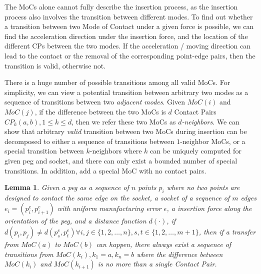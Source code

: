 \documentclass[letterpaper, 10 pt, conference]{ieeeconf}
\newtheorem{lemma}[theorem]{Lemma}
\begin{document}
The MoCs alone cannot fully describe the insertion process, as the insertion process also involves the transition between different modes. To find out whether a transition between two Mode of Contact under a given force is possible, we can find the acceleration direction under the insertion force, and the location of the different CPs between the two modes. If the acceleration / moving direction can lead to the contact or the removal of the corresponding point-edge pairs, then the transition is valid, otherwise not. 

There is a huge number of possible transitions among all valid MoCs. For simplicity, we can view a potential transition between arbitrary two modes as a sequence of transitions between two {\em adjacent modes}. Given $MoC(i)$ and $MoC(j)$, if the difference between the two MoCs is $d$ Contact Pairs $CP_k(a, b), 1\leq k\leq d$, then we refer these two MoCs as {\em $d$-neighbors}. We can show that arbitrary {\em valid} transition between two MoCs during insertion can be decomposed to either a sequence of transitions between $1$-neighbor MoCs, or a special transition between $k$-neighbors where $k$ can be uniquely computed for given peg and socket, and there can only exist a bounded number of special transitions. In addition, add a special MoC with no contact pairs. 

\begin{lemma}
Given a peg as a sequence of $n$ points $p_i$ where no two points are designed to contact the same edge on the socket, a socket of a sequence of $m$ edges $e_i = (p^e_i, p^e_{i+1})$ with uniform manufacturing error $\epsilon$, a insertion force along the orientation of the peg, and a distance function $d(\cdot)$, if $d(p_i, p_j) \neq d(p^e_s, p^e_t) \forall i, j\in\{1, 2, \ldots, n\}, s, t\in\{1, 2, \ldots, m+1\}$, then if a transfer from $MoC(a)$ to $MoC(b)$ can happen, there always exist a sequence of transitions from $MoC(k_i), k_1 = a, k_n = b$ where the difference between $MoC(k_i)$ and $MoC(k_{i+1})$ is no more than a single Contact Pair. 
\end{lemma}
\end{document}
